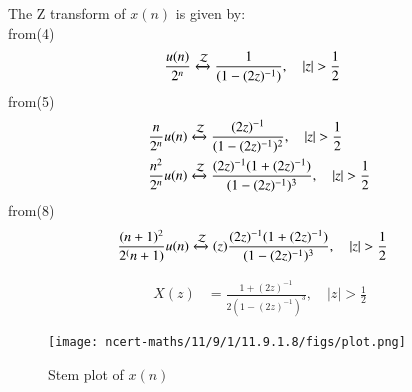 \documentclass[journal,12pt,twocolumn]{IEEEtran}
\theoremstyle{remark}
\begin{document}
The Z transform of $x(n)$ is given by:\\
from(4)
\begin{align}
\frac{u(n)}{2^n} & \xleftrightarrow{\mathcal{Z}}  \frac{1}{(1-(2z)^{-1})}, \quad \lvert z \rvert>\frac{1}{2}
\end{align}
	from(5)
\begin{align}
\frac{n}{2^n} u(n) & \xleftrightarrow{\mathcal{Z}} \frac{(2z)^{-1}}{(1-(2z)^{-1})^2}, \quad \lvert z \rvert>\frac{1}{2}\\
\frac{n^2}{2^n} u(n) & \xleftrightarrow{\mathcal{Z}} \frac{(2z)^{-1}(1 + (2z)^{-1})}{(1 - (2z)^{-1})^3}, \quad \lvert z \rvert>\frac{1}{2}
\end{align}
	from(8)
\begin{align}
\frac{(n+1)^2}{2^(n+1)} u(n) & \xleftrightarrow{\mathcal{Z}} (z) \frac{(2z)^{-1}(1 + (2z)^{-1})}{(1 - (2z)^{-1})^3}, \quad \lvert z \rvert > \frac{1}{2}
\end{align}

\begin{align}
X(z) &= \frac{1 + (2z)^{-1}}{2(1 - (2z)^{-1})^3}, \quad \lvert z \rvert > \frac{1}{2}
\end{align}

\begin{figure}[h!]
    \centering
    \texttt{[image: ncert-maths/11/9/1/11.9.1.8/figs/plot.png]}
    \caption{Stem plot of $x(n)$}
    \label{fig:1}
\end{figure}

\end{document}
